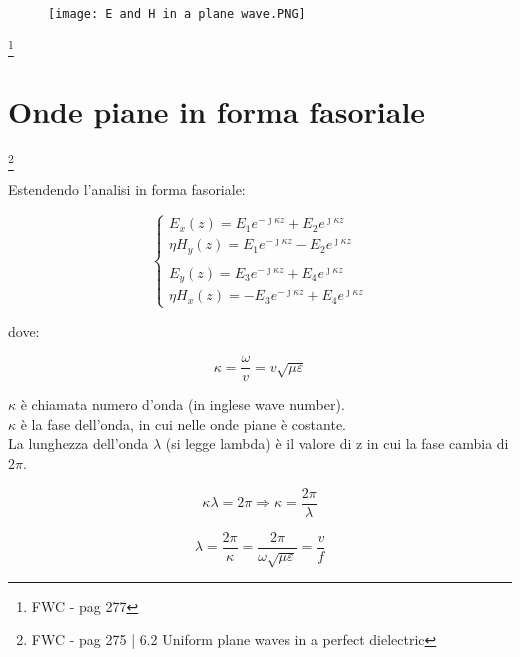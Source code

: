 \begin{figure}[h]
    \centering
    \texttt{[image: E and H in a plane wave.PNG]}
\end{figure} 

\footnote{FWC - pag 277} 

\newpage 

\section{Onde piane in forma fasoriale} 

\footnote{FWC - pag 275 | 6.2 Uniform plane waves in a perfect dielectric} 

Estendendo l'analisi in forma fasoriale: 

{\Large \begin{equation}
    \begin{cases}
        E_x (z) = E_1 e^{-\jmath \kappa z} + E_2 e^{\jmath \kappa z} \\ 
        \eta H_y (z) = E_1 e^{-\jmath \kappa z} - E_2 e^{\jmath \kappa z} \\ \\ 

        E_y (z) = E_3 e^{-\jmath \kappa z} + E_4 e^{\jmath \kappa z} \\ 
        \eta H_x (z) = - E_3 e^{-\jmath \kappa z} + E_4 e^{\jmath \kappa z}

    \end{cases}
\end{equation}} 


dove: 

{\Large \begin{equation}
    \kappa = \frac{\omega}{v} = v \sqrt{\mu \varepsilon}
\end{equation}}

$\kappa$ è chiamata numero d'onda (in inglese wave number). \\ 
$\kappa$ è la fase dell'onda, in cui nelle onde piane è costante. \\ 

La lunghezza dell'onda $\lambda$ (si legge lambda) è il valore di z in cui la fase cambia di $2 \pi$. 

{\Large \begin{equation}
    \kappa \lambda = 2 \pi 
    \Rightarrow \kappa = \frac{2 \pi}{\lambda}
\end{equation}} 


{\Large \begin{equation}
    \lambda = \frac{2 \pi}{\kappa} = \frac{2 \pi}{\omega \sqrt{\mu \varepsilon}} = \frac{v}{f} 
\end{equation}}

